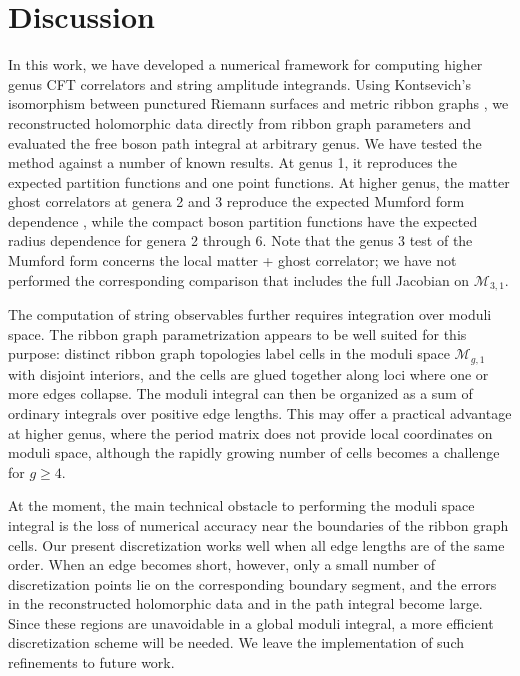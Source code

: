\documentclass[12pt]{article}
\numberwithin{equation}{section}
\begin{document}
\section{Discussion}
\label{discussionsection}

In this work, we have developed a numerical framework for computing higher genus CFT correlators and string amplitude integrands. Using Kontsevich's isomorphism between punctured Riemann surfaces and metric ribbon graphs \cite{Kontsevich:1992ti,Strebel:1967,Strebel:1984}, we reconstructed holomorphic data directly from ribbon graph parameters and evaluated the free boson path integral at arbitrary genus. We have tested the method against a number of known results. At genus 1, it reproduces the expected partition functions and one point functions. At higher genus, the matter ghost correlators at genera 2 and 3 reproduce the expected Mumford form dependence \cite{BelavinKnizhnik:1986,DHokerPhong:1988,Igusa:1962,Igusa:1967}, while the compact boson partition functions have the expected radius dependence for genera 2 through 6. Note that the genus 3 test of the Mumford form concerns the local matter + ghost correlator; we have not performed the corresponding comparison that includes the full Jacobian on $\mathcal M_{3,1}$.

The computation of string observables further requires integration over moduli space. The ribbon graph parametrization appears to be well suited for this purpose: distinct ribbon graph topologies label cells in the moduli space $\mathcal{M}_{g,1}$ with disjoint interiors, and the cells are glued together along loci where one or more edges collapse. The moduli integral can then be organized as a sum of ordinary integrals over positive edge lengths. This may offer a practical advantage at higher genus, where the period matrix does not provide local coordinates on moduli space, although the rapidly growing number of cells becomes a challenge for $g \geq 4$.

At the moment, the main technical obstacle to performing the moduli space integral is the loss of numerical accuracy near the boundaries of the ribbon graph cells. Our present discretization works well when all edge lengths are of the same order. When an edge becomes short, however, only a small number of discretization points lie on the corresponding boundary segment, and the errors in the reconstructed holomorphic data and in the path integral become large. Since these regions are unavoidable in a global moduli integral, a more efficient discretization scheme will be needed. We leave the implementation of such refinements to future work. 
\end{document}
